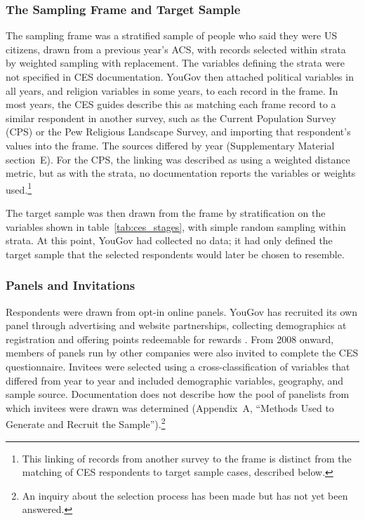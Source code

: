 \documentclass[12pt]{article}
\begin{document}



\subsubsection*{The Sampling Frame and Target Sample}

The sampling frame was a stratified sample of people who said they were US citizens, drawn from a previous year's ACS, with records selected within strata by weighted sampling with replacement. The variables defining the strata were not specified in CES documentation. YouGov then attached political variables in all years, and religion variables in some years, to each record in the frame. In most years, the CES guides describe this as matching each frame record to a similar respondent in another survey, such as the Current Population Survey (CPS) or the Pew Religious Landscape Survey, and importing that respondent's values into the frame. The sources differed by year (Supplementary Material section~E). For the CPS, the linking was described as using a weighted distance metric, but as with the strata, no documentation reports the variables or weights used.\footnote{This linking of records from another survey to the frame is distinct from the matching of CES respondents to target sample cases, described below.}

The target sample was then drawn from the frame by stratification on the variables shown in table~\ref{tab:ces_stages}, with simple random sampling within strata. At this point, YouGov had collected no data; it had only defined the target sample that the selected respondents would later be chosen to resemble.

\subsubsection*{Panels and Invitations}
Respondents were drawn from opt-in online panels. YouGov has recruited its own panel through advertising and website partnerships, collecting demographics at registration and offering points redeemable for rewards \parencite{yougov_methodology}. From 2008 onward, members of panels run by other companies were also invited to complete the CES questionnaire. Invitees were selected using a cross-classification of variables that differed from year to year and included demographic variables, geography, and sample source. Documentation does not describe how the pool of panelists from which invitees were drawn was determined (Appendix~A, ``Methods Used to Generate and Recruit the Sample'').\footnote{An inquiry about the selection process has been made but has not yet been answered.}
\end{document}
